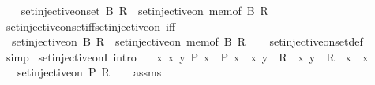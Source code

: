 \begin{isabellebody}
\ \ \isamarkupfalse%
\ {\isachardoublequoteopen}set{\isacharunderscore}{\kern0pt}injective{\isacharunderscore}{\kern0pt}on{\isacharunderscore}{\kern0pt}set\ B\ R\ {\isasymequiv}\ set{\isacharunderscore}{\kern0pt}injective{\isacharunderscore}{\kern0pt}on\ {\isacharparenleft}{\kern0pt}mem{\isacharunderscore}{\kern0pt}of\ B{\isacharparenright}{\kern0pt}\ R{\isachardoublequoteclose}\isanewline
{}\isamarkupfalse%
\isanewline
\isanewline
{}\isamarkupfalse%
\ set{\isacharunderscore}{\kern0pt}injective{\isacharunderscore}{\kern0pt}on{\isacharunderscore}{\kern0pt}set{\isacharunderscore}{\kern0pt}iff{\isacharunderscore}{\kern0pt}set{\isacharunderscore}{\kern0pt}injective{\isacharunderscore}{\kern0pt}on\ {\isacharbrackleft}{\kern0pt}iff{\isacharbrackright}{\kern0pt}{\isacharcolon}{\kern0pt}\isanewline
\ \ {\isachardoublequoteopen}set{\isacharunderscore}{\kern0pt}injective{\isacharunderscore}{\kern0pt}on\ B\ R\ {\isasymlongleftrightarrow}\ set{\isacharunderscore}{\kern0pt}injective{\isacharunderscore}{\kern0pt}on\ {\isacharparenleft}{\kern0pt}mem{\isacharunderscore}{\kern0pt}of\ B{\isacharparenright}{\kern0pt}\ R{\isachardoublequoteclose}\isanewline
%
\isadelimproof
\ \ %
\endisadelimproof
%
\isatagproof
{}\isamarkupfalse%
\ set{\isacharunderscore}{\kern0pt}injective{\isacharunderscore}{\kern0pt}on{\isacharunderscore}{\kern0pt}set{\isacharunderscore}{\kern0pt}def\ \isamarkupfalse%
\ simp%
\endisatagproof
{\isafoldproof}%
%
\isadelimproof
\isanewline
%
\endisadelimproof
\isanewline
{}\isamarkupfalse%
\ set{\isacharunderscore}{\kern0pt}injective{\isacharunderscore}{\kern0pt}onI\ {\isacharbrackleft}{\kern0pt}intro{\isacharbrackright}{\kern0pt}{\isacharcolon}{\kern0pt}\isanewline
\ \ \ {\isachardoublequoteopen}{\isasymAnd}x\ x{\isacharprime}{\kern0pt}\ y{\isachardot}{\kern0pt}\ P\ x\ {\isasymLongrightarrow}\ P\ x{\isacharprime}{\kern0pt}\ {\isasymLongrightarrow}\ {\isasymlangle}x{\isacharcomma}{\kern0pt}\ y{\isasymrangle}\ {\isasymin}\ R\ {\isasymLongrightarrow}\ {\isasymlangle}x{\isacharprime}{\kern0pt}{\isacharcomma}{\kern0pt}\ y{\isasymrangle}\ {\isasymin}\ R\ {\isasymLongrightarrow}\ x\ {\isacharequal}{\kern0pt}\ x{\isacharprime}{\kern0pt}{\isachardoublequoteclose}\isanewline
\ \ \ {\isachardoublequoteopen}set{\isacharunderscore}{\kern0pt}injective{\isacharunderscore}{\kern0pt}on\ P\ R{\isachardoublequoteclose}\isanewline
%
\isadelimproof
\ \ %
\endisadelimproof
%
\isatagproof
{}\isamarkupfalse%
\ assms\ \isamarkupfalse%

\end{isabellebody}
